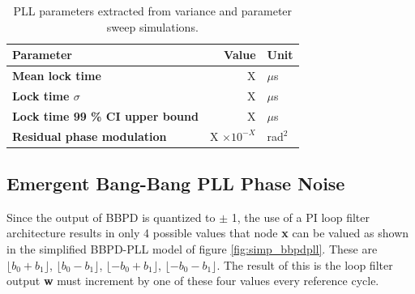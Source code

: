		\begin{table}[h!]
			\centering
			\def\arraystretch{1.5}		
			\setlength\arrayrulewidth{0.75pt}
			\setlength{\tabcolsep}{1em} %
			\begin{tabular}{|l|r|l|}
				\hline 
				\rule[-1ex]{0pt}{2.5ex} \cellcolor{gray!40}\textbf{Parameter} & \cellcolor{gray!40}\textbf{Value} & \cellcolor{gray!40}\textbf{Unit }\\ 
				\hline 
				\rule[-1ex]{0pt}{2.5ex} \textbf{Mean lock time}  & X& $\mu$s \\
				\hline 
				\rule[-1ex]{0pt}{2.5ex} \textbf{Lock time $\sigma$} &X & $\mu$s\\ 
				\hline 
				\rule[-1ex]{0pt}{2.5ex} \textbf{Lock time 99 \% CI upper bound} & X & $\mu$s\\
				\hline 
				\rule[-1ex]{0pt}{2.5ex} \textbf{Residual phase modulation} & X $\times10^{-X}$ & rad$^2$\\ 
				\hline 
			\end{tabular} 

			\caption{PLL parameters extracted from variance and parameter sweep simulations.}
			\label{simulation_params_fast}
		\end{table}

			\FloatBarrier\subsection{Emergent Bang-Bang PLL Phase Noise}\label{sec:bb_noise}
			Since the output of BBPD is quantized to $\pm$ 1, the use of a PI loop filter architecture results in only 4 possible values that node {\color{blue}\textbf{x}} can be valued as shown in the simplified BBPD-PLL model of figure \ref{fig:simp_bbpdpll}. These are $\lfloor b_0+b_1 \rfloor$, $\lfloor b_0-b_1 \rfloor$, $\lfloor -b_0+b_1 \rfloor$, $\lfloor -b_0-b_1 \rfloor$. The result of this is the loop filter output {\color{teal}\textbf{w}} must increment by one of these four values every reference cycle. 

